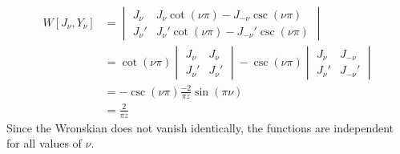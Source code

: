 {%
\begin{Solution}
  \begin{align*}
    W \left[ J_\nu, Y_\nu \right]
    &=
    \begin{vmatrix}
      J_\nu & J_\nu \cot(\nu \pi) - J_{-\nu} \csc(\nu \pi) \\
      J_\nu' & J_\nu' \cot(\nu \pi) - J_{-\nu}' \csc(\nu \pi)
    \end{vmatrix} 
    \\
    &=
    \cot(\nu \pi) 
    \begin{vmatrix}
      J_\nu & J_\nu \\
      J_\nu' & J_\nu'
    \end{vmatrix}
    - \csc( \nu \pi)
    \begin{vmatrix}
      J_\nu & J_{-\nu} \\
      J_\nu' & J_{-\nu}'
    \end{vmatrix} 
    \\
    &= - \csc(\nu \pi) \frac{-2}{\pi z} \sin( \pi \nu ) 
    \\
    &= \frac{2}{\pi z}
  \end{align*}
  Since the Wronskian does not vanish identically, the functions are 
  independent for all values of $\nu$.
\end{Solution}










}
